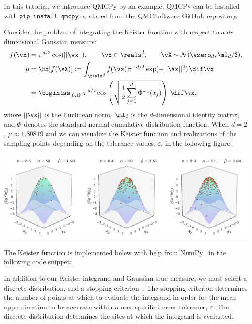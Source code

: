 In this tutorial, we introduce QMCPy \cite{QMCPy2020a}  by an example. QMCPy can be installed with \texttt{pip install qmcpy} or cloned from the  \href{https://github.com/QMCSoftware/QMCSoftware}{QMCSoftware GitHub repository}.

Consider the problem of integrating the Keister function \cite{Kei96} with respect to a $d$-dimensional Gaussian measure: 
\begin{align*}
    f(\vx) &= \pi^{d/2} \cos(||\vx||), \qquad \vx \in \reals^d, \qquad \vX \sim \mathcal{N}(\vzero_d,\mI_d/2),  
\\ \mu  &=  \Ex[f(\vX)] := \int_{\reals^d} f(\vx) \, \pi^{-d/2} \exp( - ||\vx||^2) \,  \dif \vx 
\\     &= \bigintss_{[0,1]^d} \pi^{d/2}  \cos\left(\sqrt{ \frac 12 \sum_{j=1}^d\Phi^{-1}(x_j)}\right)  \, \dif \vx. 
\end{align*}
where $||\vx||$ is the \href{https://en.wikipedia.org/wiki/Norm_(mathematics)}{Euclidean norm}, $\mI_d$ is the $d$-dimensional identity matrix, and 
$\Phi$ denotes the standard normal cumulative distribution function. When $d=2$, $\mu \approx 1.80819$ and we can visualize the Keister function and realizations of the sampling points depending on the tolerance values, $\varepsilon$, in the following figure.

\begin{center}
\includegraphics[width=1\textwidth]{Quickstart/Three_3d_SurfaceScatters.png}      
\end{center}   

The Keister function is implemented below with help from NumPy~\cite{numpy} in the following code snippet:


In addition to our Keister integrand and Gaussian true measure, we must select a discrete distribution, and a stopping criterion~\cite{HicEtal18a}. The stopping criterion determines the number of points at which to evaluate the integrand in order for the mean approximation to be accurate within a user-specified error tolerance, $\varepsilon$. The discrete distribution determines the sites at which the integrand is evaluated.


